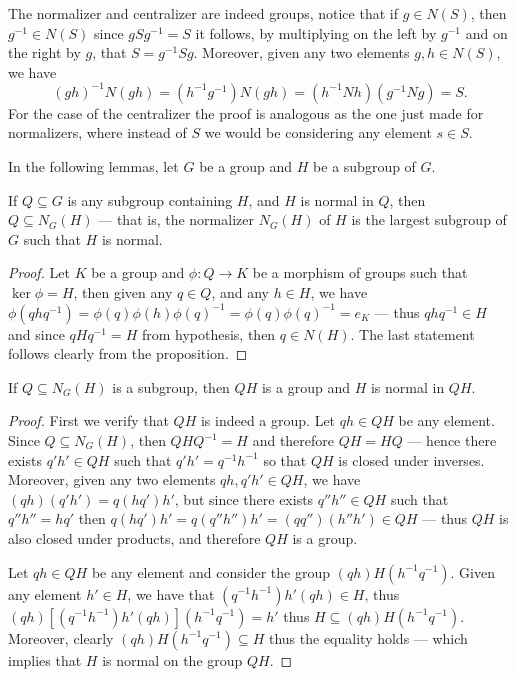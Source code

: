The normalizer and centralizer are indeed groups, notice that if \(g \in N(S)\),
then \(g^{-1} \in N(S)\) since \(g S g^{-1} = S\) it follows, by multiplying on
the left by \(g^{-1}\) and on the right by \(g\), that
\(S = g^{-1} S g\). Moreover, given any two elements \(g, h \in N(S)\), we have
\[
    (g h)^{-1} N (g h) = (h^{-1} g ^{-1}) N (g h) = (h^{-1}N h) (g^{-1} N g) = S.
\]
For the case of the centralizer the proof is analogous as the one just made for
normalizers, where instead of \(S\) we would be considering any element
\(s \in S\).

In the following lemmas, let \(G\) be a group and \(H\) be a subgroup of \(G\).

\begin{lemma}
    If \(Q \subseteq G\) is any subgroup containing \(H\), and \(H\) is normal in
    \(Q\), then \(Q \subseteq N_G(H)\) --- that is, the normalizer \(N_G(H)\) of
    \(H\) is the largest subgroup of \(G\) such that \(H\) is normal.
\end{lemma}

\begin{proof}
    Let \(K\) be a group and \(\phi: Q \to K\) be a morphism of groups such that
    \(\ker \phi = H\), then given any \(q \in Q\), and any \(h \in H\), we have
    \(\phi(q h q^{-1}) = \phi(q) \phi(h) \phi(q)^{-1} = \phi(q) \phi(q)^{-1} = e_K\)
    --- thus \(q h q^{-1} \in H\) and since \(q H q^{-1} = H\) from hypothesis, then
    \(q \in N(H)\). The last statement follows clearly from the proposition.
\end{proof}

\begin{lemma}
    If \(Q \subseteq N_G(H)\) is a subgroup, then \(Q H\) is a group and \(H\) is
    normal in \(Q H\).
\end{lemma}

\begin{proof}
    First we verify that \(Q H\) is indeed a group. Let \(q h \in Q H\) be any
    element. Since \(Q \subseteq N_G(H)\), then \(Q H Q^{-1} = H\) and therefore
    \(Q H = H Q\) --- hence there exists \(q' h' \in Q H\) such that
    \(q' h' = q^{-1} h^{-1}\) so that \(Q H\) is closed under inverses. Moreover,
    given any two elements \(q h, q' h' \in Q H\), we have
    \((q h)(q' h') = q (h q') h'\), but since there exists \(q'' h'' \in Q H\) such
    that \(q'' h'' = h q'\) then
    \(q(h q') h' = q (q'' h'') h' = (q q'') (h'' h') \in Q H\) --- thus \(Q H\) is
    also closed under products, and therefore \(Q H\) is a group.

    Let \(q h \in Q H\) be any element and consider the group
    \((q h) H (h^{-1} q^{-1})\). Given any element \(h' \in H\), we have that
    \((q^{-1} h^{-1}) h' (q h) \in H\), thus
    \((q h) [(q^{-1} h^{-1}) h' (q h)] (h^{-1} q ^{-1}) = h'\) thus
    \(H \subseteq (q h) H (h^{-1} q^{-1})\). Moreover, clearly
    \((q h) H (h^{-1} q^{-1}) \subseteq H\) thus the equality holds --- which
    implies that \(H\) is normal on the group \(Q H\).
\end{proof}

